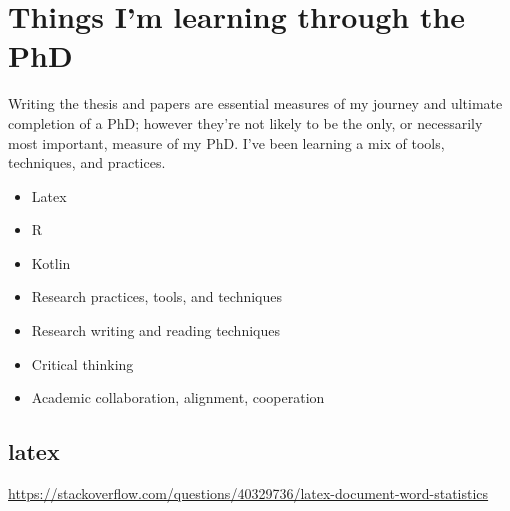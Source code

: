 \chapter{Things I'm learning through the PhD}
Writing the thesis and papers are essential measures of my journey and ultimate completion of a PhD; however they're not likely to be the only, or necessarily most important, measure of my PhD. I've been learning a mix of tools, techniques, and practices.

\begin{itemize}
    \item Latex
    \item R
    \item Kotlin
    \item Research practices, tools, and techniques
    \item Research writing and reading techniques
    \item Critical thinking
    \item Academic collaboration, alignment, cooperation
\end{itemize}{}

\section{latex}
\url{https://stackoverflow.com/questions/40329736/latex-document-word-statistics}